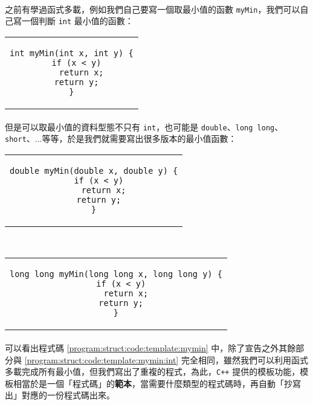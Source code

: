 \documentclass[12pt,a4paper,oneside]{report}
\begin{document}
\begin{CJK}{UTF8}{bkai}
\paragraph{}之前有學過函式多載，例如我們自己要寫一個取最小值的函數 \lstinline!myMin!，我們可以自己寫一個判斷 \lstinline!int! 最小值的函數：

\begin{code}[h!]
\centering
\begin{tabular}{c}
\begin{lstlisting}
int myMin(int x, int y) {
  if (x < y)
    return x;
  return y;
}
\end{lstlisting}
\end{tabular}
\caption{\lstinline!myMin! 函數}
\label{program:struct:code:template:mymin:int}
\end{code}

\paragraph{}但是可以取最小值的資料型態不只有 \lstinline!int!，也可能是 \lstinline!double!、\lstinline!long long!、\lstinline!short!、...等等，於是我們就需要寫出很多版本的最小值函數：

\begin{code}[h!]
\centering
\begin{subcode}{\textwidth}
  \centering
  \begin{tabular}{c}
  \begin{lstlisting}
double myMin(double x, double y) {
  if (x < y)
    return x;
  return y;
}
  \end{lstlisting}
  \end{tabular}
  \caption{\lstinline!double! 版本}
  \label{program:struct:code:template:mymin:double}
\end{subcode}
~
\begin{subcode}{\textwidth}
  \centering
  \begin{tabular}{c}
  \begin{lstlisting}
long long myMin(long long x, long long y) {
  if (x < y)
    return x;
  return y;
}
  \end{lstlisting}
  \end{tabular}
  \caption{\lstinline!long long! 版本}
  \label{program:struct:code:template:mymin:long:long}
\end{subcode}
\caption{其他 \lstinline!myMin! 函數}
\label{program:struct:code:template:mymin}
\end{code}

\paragraph{}可以看出程式碼 \ref{program:struct:code:template:mymin} 中，除了宣告之外其餘部分與 \ref{program:struct:code:template:mymin:int} 完全相同，雖然我們可以利用函式多載完成所有最小值，但我們寫出了重複的程式，為此，\texttt{C++} 提供的模板功能，模板相當於是一個「程式碼」的{\color{red}\textbf{範本}}，當需要什麼類型的程式碼時，再自動「抄寫出」對應的一份程式碼出來。


\end{CJK}
\end{document}
